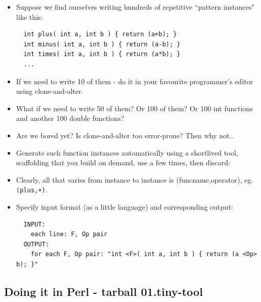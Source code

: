 \documentclass[aspectratio=169]{beamer}
\newcommand{\pitem}{\pause \item}
\begin{document}
\begin{frame}[fragile]
    \begin{itemize}
    \item
    Suppose we find ourselves writing hundreds of repetitive ``pattern instances" like this:

\tiny
\begin{verbatim}
  int plus( int a, int b ) { return (a+b); }
  int minus( int a, int b ) { return (a-b); }
  int times( int a, int b ) { return (a*b); }
  ...
\end{verbatim}
\small

   \pitem
     If we need to write 10 of them - do it in your favourite \alert{programmer's editor} using clone-and-alter.

   \pitem
     What if we need to write 50 of them?  Or 100 of them?  Or 100 int functions and another 100 double functions?

   \pitem
     Are we bored yet?  Is clone-and-alter too error-prone? Then why not..

   \pitem
     Generate such function instances automatically using a
     \alert{shortlived tool},
     scaffolding that you \alert{build} on demand,
     \alert{use} a few times, then \alert{discard}:

   \pitem
     Clearly, all that varies from instance to instance is
     (funcname,operator), eg. \verb!(plus,+)!.

    \pitem
      Specify input format (as a \alert{little language}) and corresponding
      output:

\tiny
\begin{verbatim}
  INPUT:
    each line: F, Op pair
  OUTPUT:
    for each F, Op pair: "int <F>( int a, int b ) { return (a <Op> b); }"
\end{verbatim}
\small

    \end{itemize}
\end{frame}

\subsection{Doing it in Perl - tarball 01.tiny-tool}
\end{document}
